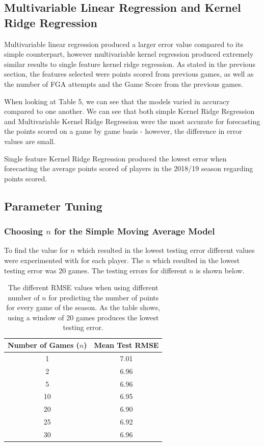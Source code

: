 \documentclass[a4paper,11pt,twoside]{article}
\begin{document}
\subsection{Multivariable Linear Regression and Kernel Ridge Regression}
Multivariable  linear regression produced a larger error value compared to its simple counterpart, however multivariable kernel regression produced extremely similar results to single feature kernel ridge regression. As stated in the previous section, the features selected were points scored from previous games, as well as the number of FGA attempts and the Game Score from the previous games.

When looking at Table 5, we can see that the models varied in accuracy compared to one another. We can see that both simple Kernel Ridge Regression and Multivariable Kernel Ridge Regression were the most accurate for forecasting the points scored on a game by game basis - however, the difference in error values are small.

Single feature Kernel Ridge Regression produced the lowest error when forecasting the average points scored of players in the 2018/19 season regarding points scored.

\subsection{Parameter Tuning}

\subsubsection{Choosing $n$ for the Simple Moving Average Model}

To find the value for $n$ which resulted in the lowest testing error different values were experimented with for each player. The $n$ which resulted in the lowest  testing error was 20 games. The testing errors for different $n$ is shown below.

\vspace{5mm}
\begin{table}[h!]
\captionsetup{justification=centering}
\begin{center}
\begin{tabular}{ |c|c|} 
 \hline
     \textbf{Number of Games ($n$)} & \textbf{Mean Test RMSE}\\ 
 \hline
 1  & 7.01\\ 
 \hline
 2 & 6.96\\ 
 \hline
 5  & 6.96 \\
 \hline
 10  & 6.95\\
 \hline
 20 & 6.90\\
 \hline
 25  & 6.92\\
 \hline
30 & 6.96\\
\hline
\end{tabular}
\end{center}
\caption{The different RMSE values when using different number of $n$ for predicting the number of points for every game of the season. As the table shows, using a window of 20 games produces the lowest testing error.}
\end{table}
\vspace{5mm}
\end{document}
